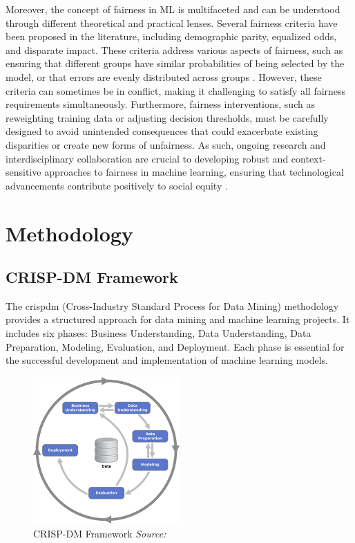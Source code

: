 \documentclass[12pt,a4paper]{report}
\begin{document}
Moreover, the concept of fairness in ML is multifaceted and can be understood through different theoretical and practical lenses. Several fairness criteria have been proposed in the literature, including demographic parity, equalized odds, and disparate impact. These criteria address various aspects of fairness, such as ensuring that different groups have similar probabilities of being selected by the model, or that errors are evenly distributed across groups \citep{barocas2023fairness}. However, these criteria can sometimes be in conflict, making it challenging to satisfy all fairness requirements simultaneously. Furthermore, fairness interventions, such as reweighting training data or adjusting decision thresholds, must be carefully designed to avoid unintended consequences that could exacerbate existing disparities or create new forms of unfairness. As such, ongoing research and interdisciplinary collaboration are crucial to developing robust and context-sensitive approaches to fairness in machine learning, ensuring that technological advancements contribute positively to social equity \citep{barocas2023fairness}.










\chapter{Methodology}

\section{CRISP-DM Framework}
The \acrshort{crispdm} (Cross-Industry Standard Process for Data Mining) methodology provides a structured approach for data mining and machine learning projects. It includes six phases: Business Understanding, Data Understanding, Data Preparation, Modeling, Evaluation, and Deployment. Each phase is essential for the successful development and implementation of machine learning models.\\

\begin{figure}[h]
    \centering
    \includegraphics[width=0.5\textwidth]{crispdmdiagram.png}
    \caption{CRISP-DM Framework \textit{Source: \cite{jensen_crispdm_image}}}
    \label{fig:crispdm}
\end{figure}
\end{document}
